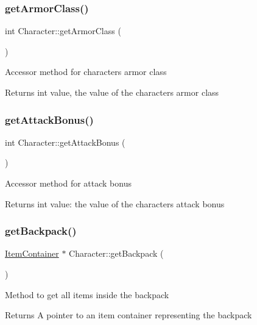 \subsubsection{\texorpdfstring{get\+Armor\+Class()}{getArmorClass()}}
{\footnotesize\ttfamily int Character\+::get\+Armor\+Class (\begin{DoxyParamCaption}{ }\end{DoxyParamCaption})}

Accessor method for character\textquotesingle{}s armor class \begin{DoxyReturn}{Returns}
int value, the value of the character\textquotesingle{}s armor class 
\end{DoxyReturn}
\hypertarget{class_character_a94cb25ccbde6ccbc6aa6b3cca01dfebc}{}\label{class_character_a94cb25ccbde6ccbc6aa6b3cca01dfebc} 
\subsubsection{\texorpdfstring{get\+Attack\+Bonus()}{getAttackBonus()}}
{\footnotesize\ttfamily int Character\+::get\+Attack\+Bonus (\begin{DoxyParamCaption}{ }\end{DoxyParamCaption})}

Accessor method for attack bonus \begin{DoxyReturn}{Returns}
int value\+: the value of the character\textquotesingle{}s attack bonus 
\end{DoxyReturn}
\hypertarget{class_character_a92bf4b3daff50c95130f5727fd39a242}{}\label{class_character_a92bf4b3daff50c95130f5727fd39a242} 
\subsubsection{\texorpdfstring{get\+Backpack()}{getBackpack()}}
{\footnotesize\ttfamily \hyperlink{class_item_container}{Item\+Container} $\ast$ Character\+::get\+Backpack (\begin{DoxyParamCaption}{ }\end{DoxyParamCaption})}

Method to get all items inside the backpack \begin{DoxyReturn}{Returns}
A pointer to an item container representing the backpack 
\end{DoxyReturn}
\hypertarget{class_character_a8b0adc0c65045b78e810fe436c636f4c}{}\label{class_character_a8b0adc0c65045b78e810fe436c636f4c} 
